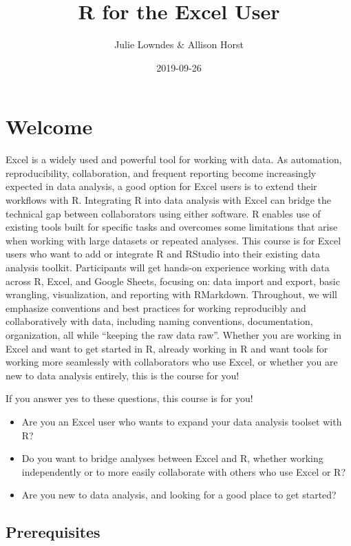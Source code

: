 \documentclass[]{book}
\title{R for the Excel User}
\author{Julie Lowndes \& Allison Horst}
\date{2019-09-26}
\providecommand{\tightlist}{%
  \setlength{\itemsep}{0pt}\setlength{\parskip}{0pt}}
\begin{document}
\maketitle

{
\setcounter{tocdepth}{1}
\tableofcontents
}
\hypertarget{welcome}{%
\chapter{Welcome}\label{welcome}}

Excel is a widely used and powerful tool for working with data. As automation, reproducibility, collaboration, and frequent reporting become increasingly expected in data analysis, a good option for Excel users is to extend their workflows with R. Integrating R into data analysis with Excel can bridge the technical gap between collaborators using either software. R enables use of existing tools built for specific tasks and overcomes some limitations that arise when working with large datasets or repeated analyses. This course is for Excel users who want to add or integrate R and RStudio into their existing data analysis toolkit. Participants will get hands-on experience working with data across R, Excel, and Google Sheets, focusing on: data import and export, basic wrangling, visualization, and reporting with RMarkdown. Throughout, we will emphasize conventions and best practices for working reproducibly and collaboratively with data, including naming conventions, documentation, organization, all while ``keeping the raw data raw''. Whether you are working in Excel and want to get started in R, already working in R and want tools for working more seamlessly with collaborators who use Excel, or whether you are new to data analysis entirely, this is the course for you!

If you answer yes to these questions, this course is for you!

\begin{itemize}
\tightlist
\item
  Are you an Excel user who wants to expand your data analysis toolset with R?
\item
  Do you want to bridge analyses between Excel and R, whether working independently or to more easily collaborate with others who use Excel or R?
\item
  Are you new to data analysis, and looking for a good place to get started?
\end{itemize}

\hypertarget{prerequisites}{%
\section{Prerequisites}\label{prerequisites}}
\end{document}
